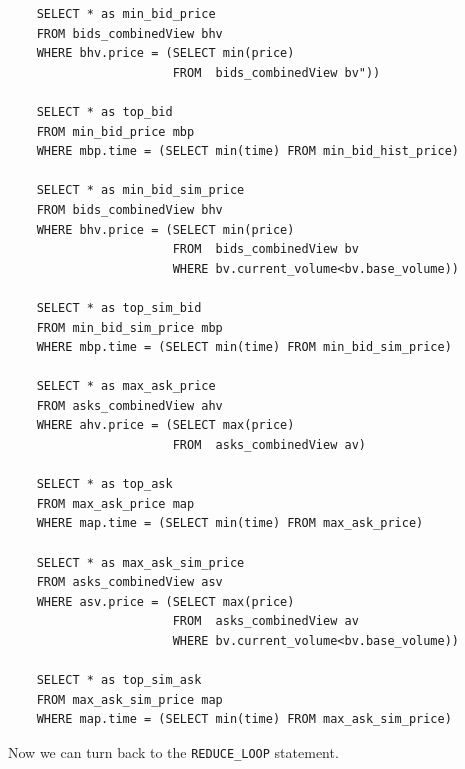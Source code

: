 \documentclass{article}
\begin{document}
\begin{verbatim}      
    SELECT * as min_bid_price
    FROM bids_combinedView bhv
    WHERE bhv.price = (SELECT min(price) 
                       FROM  bids_combinedView bv"))
    
    SELECT * as top_bid
    FROM min_bid_price mbp
    WHERE mbp.time = (SELECT min(time) FROM min_bid_hist_price)
    
    SELECT * as min_bid_sim_price
    FROM bids_combinedView bhv
    WHERE bhv.price = (SELECT min(price) 
                       FROM  bids_combinedView bv
                       WHERE bv.current_volume<bv.base_volume))
    
    SELECT * as top_sim_bid
    FROM min_bid_sim_price mbp
    WHERE mbp.time = (SELECT min(time) FROM min_bid_sim_price)
    
    SELECT * as max_ask_price
    FROM asks_combinedView ahv
    WHERE ahv.price = (SELECT max(price) 
                       FROM  asks_combinedView av)
    
    SELECT * as top_ask
    FROM max_ask_price map
    WHERE map.time = (SELECT min(time) FROM max_ask_price)
    
    SELECT * as max_ask_sim_price
    FROM asks_combinedView asv
    WHERE asv.price = (SELECT max(price) 
                       FROM  asks_combinedView av
                       WHERE bv.current_volume<bv.base_volume))
    
    SELECT * as top_sim_ask
    FROM max_ask_sim_price map
    WHERE map.time = (SELECT min(time) FROM max_ask_sim_price)
\end{verbatim}

Now we can turn back to the {\tt REDUCE\_LOOP} statement.
\end{document}
